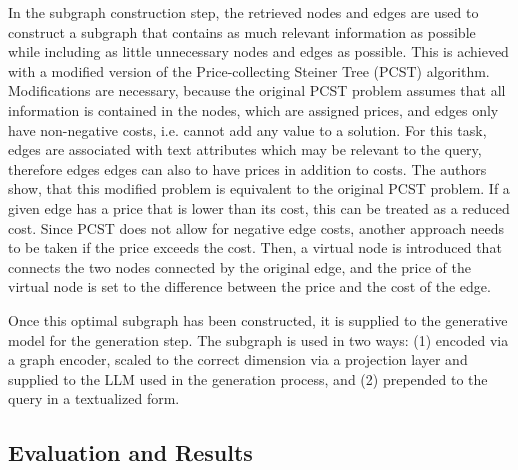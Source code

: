 In the subgraph construction step, the retrieved nodes and edges are used to construct a subgraph that contains as much relevant information as possible while including as little unnecessary nodes and edges as possible.
This is achieved with a modified version of the Price-collecting Steiner Tree (PCST) algorithm.
Modifications are necessary, because the original PCST problem assumes that all information is contained in the nodes, which are assigned prices, and edges only have non-negative costs, i.e. cannot add any value to a solution.
For this task, edges are associated with text attributes which may be relevant to the query, therefore edges edges can also to have prices in addition to costs.
The authors show, that this modified problem is equivalent to the original PCST problem.
If a given edge has a price that is lower than its cost, this can be treated as a reduced cost.
Since PCST does not allow for negative edge costs, another approach needs to be taken if the price exceeds the cost.
Then, a virtual node is introduced that connects the two nodes connected by the original edge, and the price of the virtual node is set to the difference between the price and the cost of the edge.

Once this optimal subgraph has been constructed, it is supplied to the generative model for the generation step. The subgraph is used in two ways: (1) encoded via a graph encoder, scaled to the correct dimension via a projection layer and supplied to the LLM used in the generation process, and (2) prepended to the query in a textualized form.

\subsection{Evaluation and Results}

